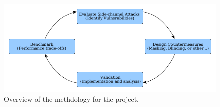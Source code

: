 \documentclass[11pt, a4paper]{article}
\begin{document}
\begin{figure}
\begin{center}



\includegraphics[scale=0.4]{cycle.png}
\caption{Overview of the methdology for the project.}
\end{center}
\end{figure}



\end{document}
